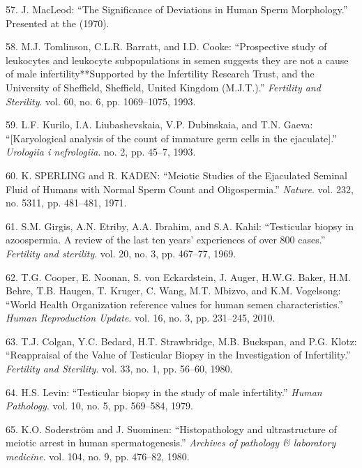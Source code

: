 \documentclass[12pt,a4paper,twoside]{ugathesis}
\theoremstyle{definition}
\theoremstyle{definition}
\theoremstyle{definition}
\theoremstyle{remark}
\begin{document}
\hypertarget{ref-MacLeod1970}{}
57. J. MacLeod: ``The Significance of Deviations in Human Sperm
Morphology.'' Presented at the (1970).

\hypertarget{ref-Tomlinson1993}{}
58. M.J. Tomlinson, C.L.R. Barratt, and I.D. Cooke: ``Prospective study
of leukocytes and leukocyte subpopulations in semen suggests they are
not a cause of male infertility**Supported by the Infertility Research
Trust, and the University of Sheffield, Sheffield, United Kingdom
(M.J.T.).'' \emph{Fertility and Sterility}. vol. 60, no. 6, pp.
1069--1075, 1993.

\hypertarget{ref-Kurilo}{}
59. L.F. Kurilo, I.A. Liubashevskaia, V.P. Dubinskaia, and T.N. Gaeva:
``{[}Karyological analysis of the count of immature germ cells in the
ejaculate{]}.'' \emph{Urologiia i nefrologiia}. no. 2, pp. 45--7, 1993.

\hypertarget{ref-SPERLING1971}{}
60. K. SPERLING and R. KADEN: ``Meiotic Studies of the Ejaculated
Seminal Fluid of Humans with Normal Sperm Count and Oligospermia.''
\emph{Nature}. vol. 232, no. 5311, pp. 481--481, 1971.

\hypertarget{ref-Girgis}{}
61. S.M. Girgis, A.N. Etriby, A.A. Ibrahim, and S.A. Kahil: ``Testicular
biopsy in azoospermia. A review of the last ten years' experiences of
over 800 cases.'' \emph{Fertility and sterility}. vol. 20, no. 3, pp.
467--77, 1969.

\hypertarget{ref-Cooper2010}{}
62. T.G. Cooper, E. Noonan, S. von Eckardstein, J. Auger, H.W.G. Baker,
H.M. Behre, T.B. Haugen, T. Kruger, C. Wang, M.T. Mbizvo, and K.M.
Vogelsong: ``World Health Organization reference values for human semen
characteristics.'' \emph{Human Reproduction Update}. vol. 16, no. 3, pp.
231--245, 2010.

\hypertarget{ref-Colgan1980}{}
63. T.J. Colgan, Y.C. Bedard, H.T. Strawbridge, M.B. Buckspan, and P.G.
Klotz: ``Reappraisal of the Value of Testicular Biopsy in the
Investigation of Infertility.'' \emph{Fertility and Sterility}. vol. 33,
no. 1, pp. 56--60, 1980.

\hypertarget{ref-Levin1979}{}
64. H.S. Levin: ``Testicular biopsy in the study of male infertility.''
\emph{Human Pathology}. vol. 10, no. 5, pp. 569--584, 1979.

\hypertarget{ref-Soderstrom1980}{}
65. K.O. Soderström and J. Suominen: ``Histopathology and ultrastructure
of meiotic arrest in human spermatogenesis.'' \emph{Archives of
pathology \& laboratory medicine}. vol. 104, no. 9, pp. 476--82, 1980.
\end{document}
